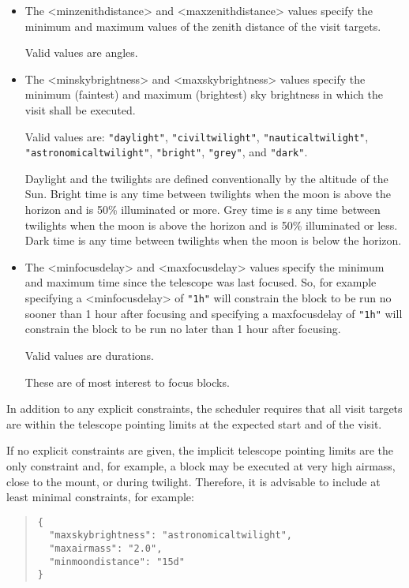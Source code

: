 \begin{itemize}
\item 
The <minzenithdistance> and <maxzenithdistance> values specify the minimum and maximum values of the zenith distance of the visit targets.

Valid values are angles.

\item The <minskybrightness> and <maxskybrightness> values specify the minimum (faintest) and maximum (brightest) sky brightness in which the visit shall be executed. 
    
Valid values are: \verb|"daylight"|, \verb|"civiltwilight"|, \verb|"nauticaltwilight"|, \verb|"astronomicaltwilight"|, \verb|"bright"|, \verb|"grey"|, and \verb|"dark"|. 
    
Daylight and the twilights are defined conventionally by the altitude of the Sun. Bright time is any time between twilights when the moon is above the horizon and is 50\% illuminated or more. Grey time is s any time between twilights when the moon is above the horizon and is 50\% illuminated or less. Dark time is any time between twilights when the moon is below the horizon.
    
\item
The <minfocusdelay> and <maxfocusdelay> values specify the minimum and maximum time since the telescope was last focused. So, for example specifying a <minfocusdelay> of \verb|"1h"| will constrain the block to be run no sooner than 1 hour after focusing and specifying a maxfocusdelay of \verb|"1h"| will constrain the block to be run no later than 1 hour after focusing.

Valid values are durations.

These are of most interest to focus blocks.

\end{itemize}

In addition to any explicit constraints, the scheduler requires that all visit targets are within the telescope pointing limits at the expected start and of the visit.

If no explicit constraints are given, the implicit telescope pointing limits are the only constraint and, for example, a block may be executed at very high airmass, close to the mount, or during twilight. Therefore, it is advisable to include at least minimal constraints, for example:
\begin{quote}
\begin{verbatim}
{
  "maxskybrightness": "astronomicaltwilight",
  "maxairmass": "2.0",
  "minmoondistance": "15d"
}
\end{verbatim}
\end{quote}

